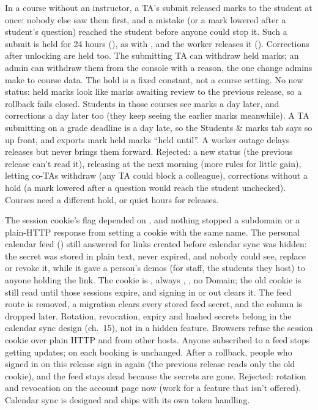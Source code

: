   {In a course without an instructor, a TA's submit released marks to the student at once: nobody
   else saw them first, and a mistake (or a mark lowered after a student's question) reached the
   student before anyone could stop it.}
  {Such a submit is held for 24 hours (), as  with
   , and the worker releases it (). Corrections
   after unlocking are held too. The submitting TA can withdraw held marks; an admin can withdraw
   them from the console with a reason, the one change admins make to course data. The hold is a
   fixed constant, not a course setting. No new status: held marks look like marks awaiting review
   to the previous release, so a rollback fails closed.}
  {Students in those courses see marks a day later, and corrections a day later too (they keep
   seeing the earlier marks meanwhile). A TA submitting on a grade deadline is a day late, so the
   Students \& marks tab says so up front, and exports mark held marks ``held until''. A worker
   outage delays releases but never brings them forward. Rejected: a new  status (the
   previous release can't read it), releasing at the next morning (more rules for little gain),
   letting co-TAs withdraw (any TA could block a colleague), corrections without a hold (a mark
   lowered after a question would reach the student unchecked).}
  {Courses need a different hold, or quiet hours for releases.}

  {The session cookie's  flag depended on , and nothing stopped a
   subdomain or a plain-HTTP response from setting a cookie with the same name. The personal
   calendar feed () still answered for links created before calendar sync
   was hidden: the secret was stored in plain text, never expired, and nobody could see, replace or
   revoke it, while it gave a person's demos (for staff, the students they host) to anyone holding
   the link.}
  {The cookie is , always , , no Domain;
   the old  cookie is still read until those sessions expire, and signing in
   or out clears it. The feed route is removed, a migration clears every stored feed secret, and
   the column is dropped later. Rotation, revocation, expiry and hashed secrets belong in the
   calendar sync design (ch.~15), not in a hidden feature.}
  {Browsers refuse the session cookie over plain HTTP and from other hosts. Anyone subscribed to a
   feed stops getting updates;  on each booking is unchanged. After a rollback,
   people who signed in on this release sign in again (the previous release reads only the old
   cookie), and the feed stays dead because the secrets are gone. Rejected: rotation and revocation
   on the account page now (work for a feature that isn't offered).}
  {Calendar sync is designed and ships with its own token handling.}

